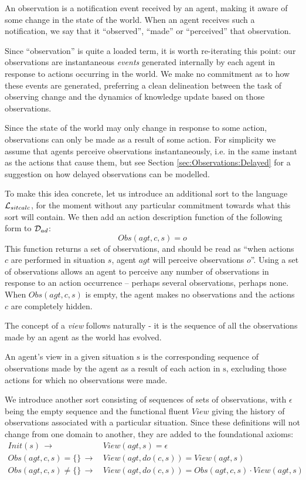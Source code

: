 \begin{defnL}
[{Observations}] An observation is a notification event received
by an agent, making it aware of some change in the state of the world.
When an agent receives such a notification, we say that it {}``observed'',
{}``made'' or {}``perceived'' that observation. 
\end{defnL}
Since {}``observation'' is quite a loaded term, it is worth re-iterating
this point: our observations are instantaneous \emph{events} generated
internally by each agent in response to actions occurring in the world.
We make no commitment as to how these events are generated, preferring
a clean delineation between the task of observing change and the dynamics
of knowledge update based on those observations.

Since the state of the world may only change in response to some action,
observations can only be made as a result of some action. For simplicity
we assume that agents perceive observations instantaneously, i.e.
in the same instant as the actions that cause them, but see Section
\ref{sec:Observations:Delayed} for a suggestion on how delayed observations
can be modelled.

To make this idea concrete, let us introduce an additional sort 
to the language $\mathcal{L}_{sitcalc}$, for the moment without any particular commitment
towards what this sort will contain. We then add an action description
function of the following form to $\mathcal{D}_{ad}$:\[
Obs(agt,c,s)=o\]
 This function returns a set of observations, and should be read as
{}``when actions $c$ are performed in situation $s$, agent $agt$
will perceive observations $o$''. Using a set of observations allows
an agent to perceive any number of observations in response to an
action occurrence -- perhaps several observations, perhaps none. When
$Obs(agt,c,s)$ is empty, the agent makes no observations and the
actions $c$ are completely hidden.

The concept of a \emph{view} follows naturally - it is the sequence
of all the observations made by an agent as the world has evolved.

\begin{defnL}
[{Views}] An agent's view in a given situation $\mathrm{s}$
is the corresponding sequence of observations made by the agent as
a result of each action in $\mathrm{s}$, excluding those actions
for which no observations were made. \label{defn:Observations:View} 
\end{defnL}
We introduce another sort  consisting of sequences of sets
of observations, with $\epsilon$ being the empty sequence and the
functional fluent $View$ giving the history of observations associated
with a particular situation. Since these definitions will not change
from one domain to another, they are added to the foundational axioms:\begin{align}
Init(s)\,\rightarrow & \, View(agt,s)=\epsilon\nonumber \\
Obs(agt,c,s)=\{\}\,\rightarrow & \, View(agt,do(c,s))=View(agt,s)\nonumber \\
Obs(agt,c,s)\neq\{\}\,\rightarrow & \, View(agt,do(c,s))=Obs(agt,c,s)\cdot View(agt,s)\label{eq:view_defn}\end{align}


